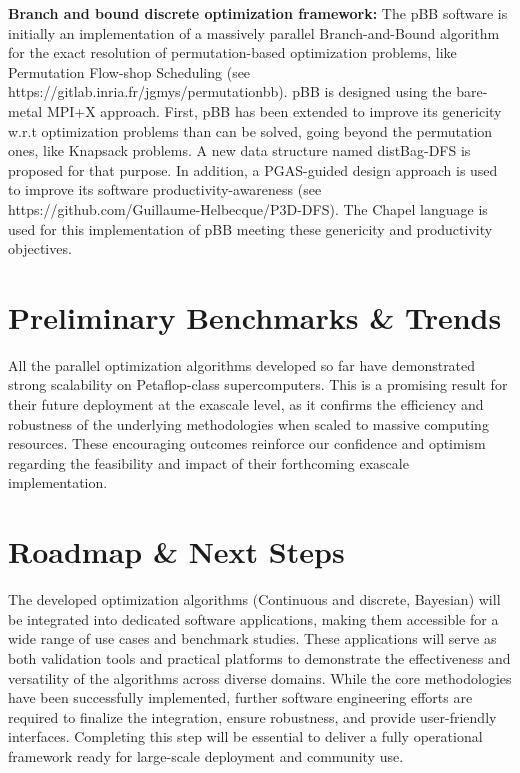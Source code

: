 {\bf Branch and bound discrete optimization framework:} The pBB software is initially an implementation of a massively parallel Branch-and-Bound algorithm for
the exact resolution of permutation-based optimization problems, like Permutation Flow-shop
Scheduling (see https://gitlab.inria.fr/jgmys/permutationbb). pBB is designed using
the bare-metal MPI+X approach. First, pBB has been extended to improve its genericity w.r.t
optimization problems than can be solved, going beyond the permutation ones, like Knapsack
problems. A new data structure named distBag-DFS is proposed for that purpose. In addition,
a PGAS-guided design approach is used to improve its software productivity-awareness (see
https://github.com/Guillaume-Helbecque/P3D-DFS). The Chapel language is used for this
implementation of pBB meeting these genericity and productivity objectives.

\medskip


\section{Preliminary Benchmarks \& Trends}

All the parallel optimization algorithms developed so far have demonstrated strong scalability on Petaflop-class supercomputers. This is a promising result for their future deployment at the exascale level, as it confirms the efficiency and robustness of the underlying methodologies when scaled to massive computing resources. These encouraging outcomes reinforce our confidence and optimism regarding the feasibility and impact of their forthcoming exascale implementation.

\section{Roadmap \& Next Steps}

The developed optimization algorithms (Continuous and discrete, Bayesian) will be integrated into dedicated software applications, making them accessible for a wide range of use cases and benchmark studies. These applications will serve as both validation tools and practical platforms to demonstrate the effectiveness and versatility of the algorithms across diverse domains. While the core methodologies have been successfully implemented, further software engineering efforts are required to finalize the integration, ensure robustness, and provide user-friendly interfaces. Completing this step will be essential to deliver a fully operational framework ready for large-scale deployment and community use.

